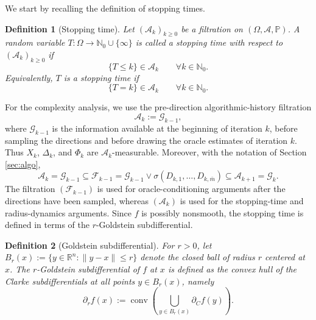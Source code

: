 \documentclass[11pt,a4paper]{article}
\newtheorem{definition}{Definition}[section]
\newcommand{\goldelta}{r}
\newcommand{\Xk}{X_k}
\begin{document}
We start by recalling the definition of stopping times.
\begin{definition}[Stopping time]
Let $(\mathcal A_k)_{k\ge0}$ be a filtration on
$(\Omega,\mathcal A,\mathbb P)$. A random variable
\(
    T:\Omega\to\mathbb N_0\cup\{\infty\}
\)
is called a stopping time with respect to $(\mathcal A_k)_{k\ge0}$ if
\[
    \{T\le k\}\in\mathcal A_k
    \qquad
    \forall k\in\mathbb N_0 .
\]
Equivalently, \(T\) is a stopping time if
\[
    \{T=k\}\in\mathcal A_k
    \qquad
    \forall k\in\mathbb N_0 .
\]
\end{definition}
For the complexity analysis, we use the pre-direction algorithmic-history filtration
\[
    \mathcal A_k:=\mathcal G_{k-1},
\]
where \(\mathcal G_{k-1}\) is the information available at the beginning of
iteration \(k\), before sampling the directions and before drawing the oracle
estimates of iteration \(k\). Thus \(X_k\), \(\Delta_k\), and \(\Phi_k\) are
\(\mathcal A_k\)-measurable. Moreover, with the notation of Section \ref{sec:algo},
\[
    \mathcal A_k=\mathcal G_{k-1}
    \subseteq
    \mathcal F_{k-1}
    =
    \mathcal G_{k-1}
    \vee
    \sigma(D_{k,1},\ldots,D_{k,\bar{m}})
    \subseteq
    \mathcal A_{k+1}=\mathcal G_k .
\]
The filtration \((\mathcal F_{k-1})\) is used for oracle-conditioning
arguments after the directions have been sampled, whereas
\((\mathcal A_k)\) is used for the stopping-time and radius-dynamics
arguments. Since \(f\) is possibly nonsmooth, the stopping time is defined in terms of the
\(\goldelta\)-Goldstein subdifferential.
\begin{definition}[Goldstein subdifferential]
For \(r>0\), let
$B_r(x):=\{y\in\mathbb{R}^n:\|y-x\|\le r\}
$
denote the closed ball of radius \(r\) centered at \(x\). The
\emph{\(r\)-Goldstein subdifferential} of \(f\) at \(x\) is defined as the
convex hull of the Clarke subdifferentials at all points \(y\in B_r(x)\), namely
\[
\partial_r f(x)
:=
\operatorname{conv}\left(
\bigcup_{y\in B_r(x)} \partial_C f(y)
\right).
\]
\end{definition}
\end{document}
